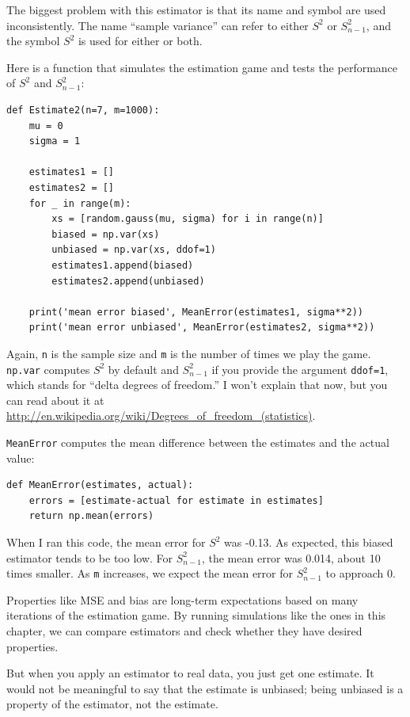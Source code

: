 \documentclass[12pt]{book}
\begin{document}
The biggest problem with this estimator is that its name and symbol
are used inconsistently.  The name ``sample variance'' can refer to
either $S^2$ or $S_{n-1}^2$, and the symbol $S^2$ is used
for either or both.

Here is a function that simulates the estimation game and tests
the performance of $S^2$ and $S_{n-1}^2$:

\begin{verbatim}
def Estimate2(n=7, m=1000):
    mu = 0
    sigma = 1

    estimates1 = []
    estimates2 = []
    for _ in range(m):
        xs = [random.gauss(mu, sigma) for i in range(n)]
        biased = np.var(xs)
        unbiased = np.var(xs, ddof=1)
        estimates1.append(biased)
        estimates2.append(unbiased)

    print('mean error biased', MeanError(estimates1, sigma**2))
    print('mean error unbiased', MeanError(estimates2, sigma**2))
\end{verbatim}

Again, {\tt n} is the sample size and {\tt m} is the number of times
we play the game.  {\tt np.var} computes $S^2$ by default and
$S_{n-1}^2$ if you provide the argument {\tt ddof=1}, which stands for
``delta degrees of freedom.''  I won't explain that now, but you can read
about it at
\url{http://en.wikipedia.org/wiki/Degrees_of_freedom_(statistics)}.

{\tt MeanError} computes the mean difference between the estimates
and the actual value:

\begin{verbatim}
def MeanError(estimates, actual):
    errors = [estimate-actual for estimate in estimates]
    return np.mean(errors)
\end{verbatim}

When I ran this code, the mean error for $S^2$ was -0.13.  As
expected, this biased estimator tends to be too low.  For $S_{n-1}^2$,
the mean error was 0.014, about 10 times smaller.  As {\tt m}
increases, we expect the mean error for $S_{n-1}^2$ to approach 0.

Properties like MSE and bias are long-term expectations based on
many iterations of the estimation game.  By running simulations like
the ones in this chapter, we can compare estimators and check whether
they have desired properties.

But when you apply an estimator to real
data, you just get one estimate.  It would not be meaningful to say
that the estimate is unbiased; being unbiased is a property of the
estimator, not the estimate.
\end{document}
